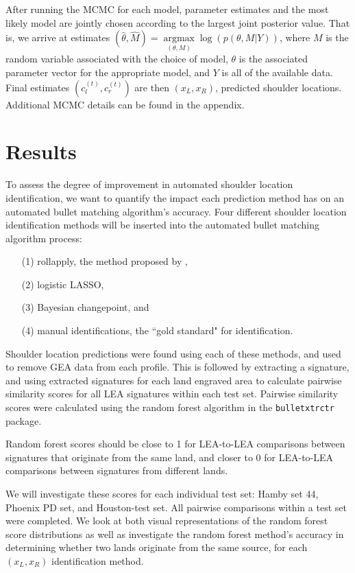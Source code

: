 \documentclass[12pt]{article}
\begin{document}
After running the MCMC for each model, parameter estimates and the most
likely model are jointly chosen according to the largest joint posterior
value. That is, we arrive at estimates
\((\hat{\theta}, \hat{M}) = \underset{(\theta, M)}{\operatorname{argmax}}{\log(p(\theta, M | Y))}\),
where \(M\) is the random variable associated with the choice of model,
\(\theta\) is the associated parameter vector for the appropriate model,
and \(Y\) is all of the available data. Final estimates
\((c_l^{(t)}, c_r^{(t)})\) are then \((x_L, x_R)\), predicted shoulder
locations. Additional MCMC details can be found in the appendix.

\section{Results}

To assess the degree of improvement in automated shoulder location
identification, we want to quantify the impact each prediction method
has on an automated bullet matching algorithm's accuracy. Four different
shoulder location identification methods will be inserted into the
automated bullet matching algorithm process:

\begin{itemize}
\item[(1)] rollapply, the method proposed by \cite{Hare1}, 
\item[(2)] logistic LASSO,
\item[(3)] Bayesian changepoint, and
\item[(4)] manual identifications, the ``gold standard" for identification.  
\end{itemize}

Shoulder location predictions were found using each of these methods,
and used to remove GEA data from each profile. This is followed by
extracting a signature, and using extracted signatures for each land
engraved area to calculate pairwise similarity scores for all LEA
signatures within each test set. Pairwise similarity scores were
calculated using the random forest algorithm in the
\texttt{bulletxtrctr} package.

Random forest scores should be close to 1 for LEA-to-LEA comparisons
between signatures that originate from the same land, and closer to 0
for LEA-to-LEA comparisons between signatures from different lands.

{\color{purple}{This section needs to be expanded and more details need to be given:}}
We will investigate these scores for each individual test set: Hamby set
44, Phoenix PD set, and Houston-test set. All pairwise comparisons
within a test set were completed. We look at both visual representations
of the random forest score distributions as well as investigate the
random forest method's accuracy in determining whether two lands
originate from the same source, for each \((x_L, x_R)\) identification
method.
\end{document}
